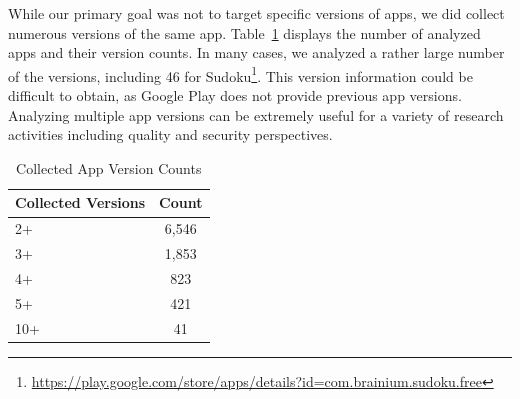\documentclass{sig-alternate-05-2015}
\begin{document}
%
%
%
%	
%	 	
%
%





While our primary goal was not to target specific versions of apps, we did collect numerous versions of the same app. Table~\ref{Table:versionCounts} displays the number of analyzed apps and their version counts. In many cases, we analyzed a rather large number of the versions, including 46 for Sudoku\footnote{\url{https://play.google.com/store/apps/details?id=com.brainium.sudoku.free}}. This version information could be difficult to obtain, as Google Play does not provide previous app versions. Analyzing multiple app versions can be extremely useful for a variety of research activities including quality and security perspectives.

\begin{table}[ht]
\begin{center}
\caption{Collected App Version Counts}
\label{Table:versionCounts}
 \begin{tabular}{ | l | c | } \hline

	  \bfseries Collected Versions & \bfseries   Count \\ \hline
	
	2+ &	6,546 \\ \hline
	3+ &	1,853 \\ \hline
	4+ &	823 \\ \hline
	5+ &	421 \\ \hline
    10+ & 41 \\ \hline
        	 	
  \end{tabular}
\end{center}
\end{table}
\end{document}
